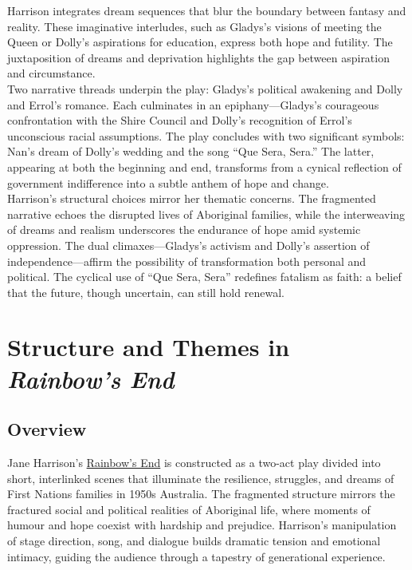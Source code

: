 \documentclass[a4paper]{article}
\begin{document}
Harrison integrates dream sequences that blur the boundary between fantasy and reality. These imaginative interludes, such as Gladys’s visions of meeting the Queen or Dolly’s aspirations for education, express both hope and futility. The juxtaposition of dreams and deprivation highlights the gap between aspiration and circumstance.\\

Two narrative threads underpin the play: Gladys’s political awakening and Dolly and Errol’s romance. Each culminates in an epiphany—Gladys’s courageous confrontation with the Shire Council and Dolly’s recognition of Errol’s unconscious racial assumptions. The play concludes with two significant symbols: Nan’s dream of Dolly’s wedding and the song “Que Sera, Sera.” The latter, appearing at both the beginning and end, transforms from a cynical reflection of government indifference into a subtle anthem of hope and change.\\

Harrison’s structural choices mirror her thematic concerns. The fragmented narrative echoes the disrupted lives of Aboriginal families, while the interweaving of dreams and realism underscores the endurance of hope amid systemic oppression. The dual climaxes—Gladys’s activism and Dolly’s assertion of independence—affirm the possibility of transformation both personal and political. The cyclical use of “Que Sera, Sera” redefines fatalism as faith: a belief that the future, though uncertain, can still hold renewal.\\

\section{Structure and Themes in \textit{Rainbow's End}}

\subsection{Overview}
Jane Harrison’s \underline{Rainbow's End} is constructed as a two-act play divided into short, interlinked scenes that illuminate the resilience, struggles, and dreams of First Nations families in 1950s Australia. The fragmented structure mirrors the fractured social and political realities of Aboriginal life, where moments of humour and hope coexist with hardship and prejudice. Harrison’s manipulation of stage direction, song, and dialogue builds dramatic tension and emotional intimacy, guiding the audience through a tapestry of generational experience.\\
\end{document}
